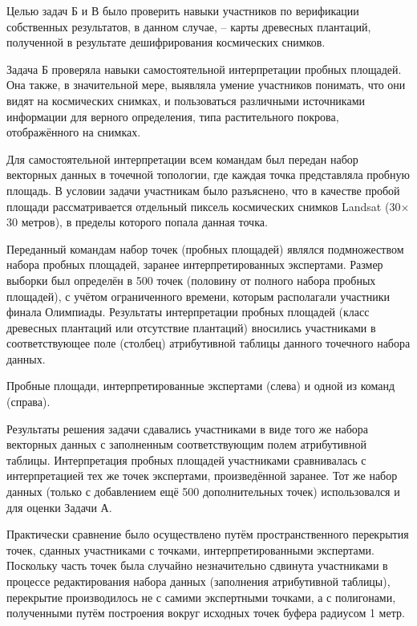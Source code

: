 \solutionSection

Целью задач Б и В было проверить навыки участников по верификации собственных результатов, в данном случае, – карты древесных плантаций, полученной в результате дешифрирования космических снимков.

Задача Б проверяла навыки самостоятельной интерпретации пробных площадей. Она также, в значительной мере, выявляла умение участников понимать, что они видят на космических снимках, и пользоваться различными источниками информации для верного определения, типа растительного покрова, отображённого на снимках.

Для самостоятельной интерпретации всем командам был передан набор векторных данных в точечной топологии, где каждая точка представляла пробную площадь. В условии задачи участникам было разъяснено, что в качестве пробой площади рассматривается отдельный пиксель космических снимков Landsat (30$\times$30 метров), в пределы которого попала данная точка.

Переданный командам набор точек (пробных площадей) являлся подмножеством набора пробных площадей, заранее интерпретированных экспертами. Размер выборки был определён в 500 точек (половину от полного набора пробных площадей), с учётом ограниченного времени, которым располагали участники финала Олимпиады. Результаты интерпретации пробных площадей (класс древесных плантаций или отсутствие плантаций) вносились участниками в соответствующее поле (столбец) атрибутивной таблицы данного точечного набора данных.


\begin{center}
    Пробные площади, интерпретированные экспертами (слева) и одной из команд (справа).
\end{center}

Результаты решения задачи сдавались участниками в виде того же набора векторных данных с заполненным соответствующим полем атрибутивной таблицы. Интерпретация пробных площадей участниками сравнивалась с интерпретацией тех же точек экспертами, произведённой заранее. Тот же набор данных (только с добавлением ещё 500 дополнительных точек) использовался и для оценки Задачи А.

Практически сравнение было осуществлено путём пространственного перекрытия точек, сданных участниками с точками, интерпретированными экспертами. Поскольку часть точек была случайно незначительно сдвинута участниками в процессе редактирования набора данных (заполнения атрибутивной таблицы), перекрытие производилось не с самими экспертными точками, а с полигонами, полученными путём построения вокруг исходных точек буфера радиусом 1 метр.

